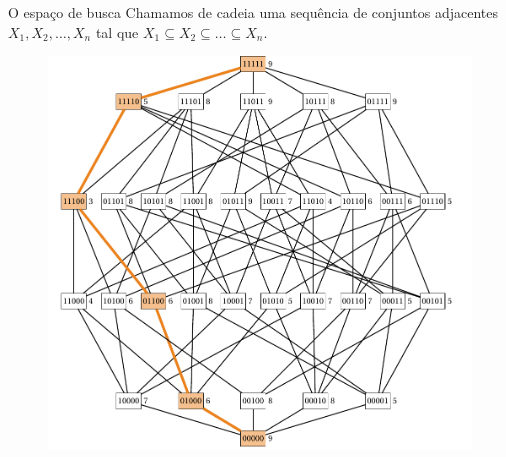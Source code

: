 \documentclass{beamer}
\begin{document}
\begin{frame}{O espaço de busca}
  Chamamos de \alert{cadeia} uma sequência de conjuntos adjacentes 
  $X_1, X_2, \dots, X_n$ tal que $X_1 \subseteq X_2 \subseteq \dots \subseteq X_n$. 
  \pause
  \begin{figure}
    \centering
    \includegraphics[clip=true, width=.6\textwidth]{lattice/chain.pdf}
  \end{figure}
\end{frame}
\end{document}
